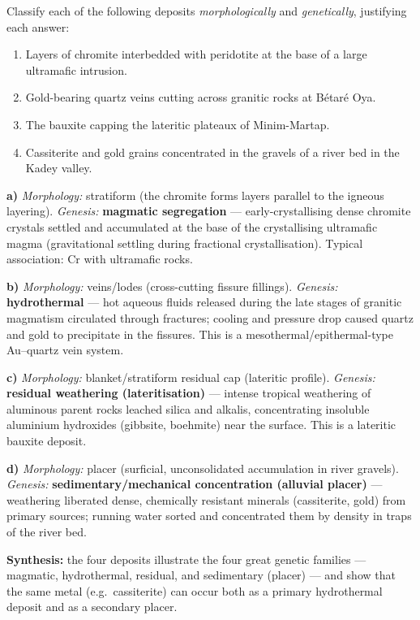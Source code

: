 \documentclass[11pt]{article}
\begin{document}
\begin{exoresolu}
Classify each of the following deposits \emph{morphologically} and \emph{genetically}, justifying each answer:
\begin{enumerate}
\item[a)] Layers of chromite interbedded with peridotite at the base of a large ultramafic intrusion.
\item[b)] Gold-bearing quartz veins cutting across granitic rocks at B\'etar\'e Oya.
\item[c)] The bauxite capping the lateritic plateaux of Minim-Martap.
\item[d)] Cassiterite and gold grains concentrated in the gravels of a river bed in the Kadey valley.
\end{enumerate}
\tcblower
\textbf{a)} \emph{Morphology:} stratiform (the chromite forms layers parallel to the igneous layering). \emph{Genesis:} \textbf{magmatic segregation} — early-crystallising dense chromite crystals settled and accumulated at the base of the crystallising ultramafic magma (gravitational settling during fractional crystallisation). Typical association: Cr with ultramafic rocks.

\textbf{b)} \emph{Morphology:} veins/lodes (cross-cutting fissure fillings). \emph{Genesis:} \textbf{hydrothermal} — hot aqueous fluids released during the late stages of granitic magmatism circulated through fractures; cooling and pressure drop caused quartz and gold to precipitate in the fissures. This is a mesothermal/epithermal-type Au--quartz vein system.

\textbf{c)} \emph{Morphology:} blanket/stratiform residual cap (lateritic profile). \emph{Genesis:} \textbf{residual weathering (lateritisation)} — intense tropical weathering of aluminous parent rocks leached silica and alkalis, concentrating insoluble aluminium hydroxides (gibbsite, boehmite) near the surface. This is a lateritic bauxite deposit.

\textbf{d)} \emph{Morphology:} placer (surficial, unconsolidated accumulation in river gravels). \emph{Genesis:} \textbf{sedimentary/mechanical concentration (alluvial placer)} — weathering liberated dense, chemically resistant minerals (cassiterite, gold) from primary sources; running water sorted and concentrated them by density in traps of the river bed.

\textbf{Synthesis:} the four deposits illustrate the four great genetic families — magmatic, hydrothermal, residual, and sedimentary (placer) — and show that the same metal (e.g.\ cassiterite) can occur both as a primary hydrothermal deposit and as a secondary placer.
\end{exoresolu}
\end{document}
